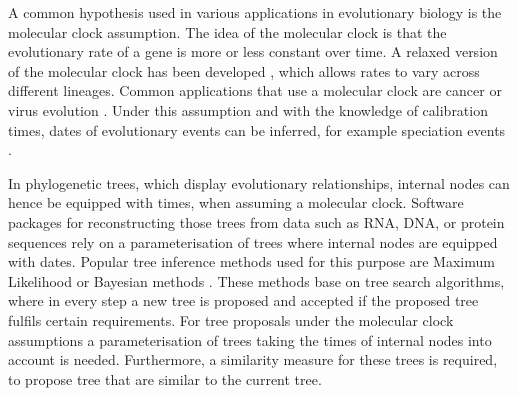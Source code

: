 \documentclass[11pt]{amsart}
\newcommand{\summary}[1]{} %
\begin{document}

\summary{Why we want a time-tree space}

\summary{Molecular clock and divergence dating}
A common hypothesis used in various applications in evolutionary biology is the molecular clock assumption.
The idea of the molecular clock is that the evolutionary rate of a gene is more or less constant over time.
A relaxed version of the molecular clock has been developed \autocite{Thorne1998-ev, Rambaut1998-kq, Kumar2016-eu}, which allows rates to vary across different lineages.
Common applications that use a molecular clock are cancer \autocite{Alves2019-eo, Naxerova2015-qg} or virus evolution \autocite{Korber2000-sp}.
Under this assumption and with the knowledge of calibration times, dates of evolutionary events can be inferred, for example speciation events \autocite{Yoder2000-ks}.

\summary{Software needs to deal with clock trees, tree proposals}
In phylogenetic trees, which display evolutionary relationships, internal nodes can hence be equipped with times, when assuming a molecular clock.
Software packages for reconstructing those trees from data such as RNA, DNA, or protein sequences rely on a parameterisation of trees where internal nodes are equipped with dates.
Popular tree inference methods used for this purpose are Maximum Likelihood \autocite{Kozlov2019-cf, Nguyen2015-sp, Tamura2011-ky} or Bayesian methods \autocite{Bouckaert2014-ir,Suchard2018-tw, Ronquist2003-eq}.
These methods base on tree search algorithms, where in every step a new tree is proposed and accepted if the proposed tree fulfils certain requirements.
For tree proposals under the molecular clock assumptions a parameterisation of trees taking the times of internal nodes into account is needed.
Furthermore, a similarity measure for these trees is required, to propose tree that are similar to the current tree.
\end{document}
